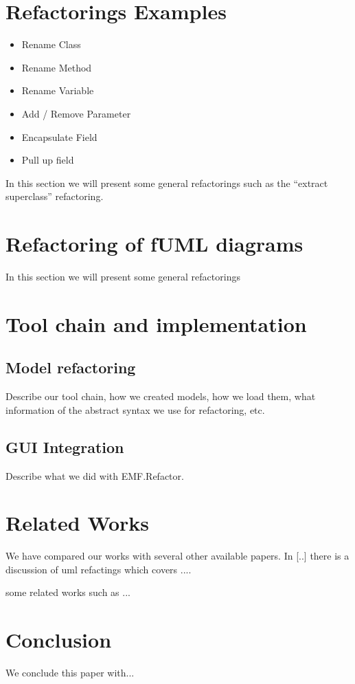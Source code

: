 \documentclass{llncs}
\begin{document}
\section{Refactorings Examples}
\begin{itemize}
\item Rename Class
\item Rename Method
\item Rename Variable
\item Add / Remove Parameter
\item Encapsulate Field
\item Pull up field
\end{itemize}

In this section we will present some general refactorings such as the ``extract superclass'' refactoring.

\section{Refactoring of fUML diagrams}
In this section we will present some general refactorings

\section{Tool chain and implementation}

\subsection{Model refactoring}
Describe our tool chain, how we created models, how we load them, what information of the abstract syntax we use for refactoring, etc.

\subsection{GUI Integration}
Describe what we did with EMF.Refactor.

\section{Related Works}
We have compared our works with several other available papers. In [..] there is a discussion of uml refactings which covers ....

some related works such as ...

\section{Conclusion}
We conclude this paper with...



\end{document}
